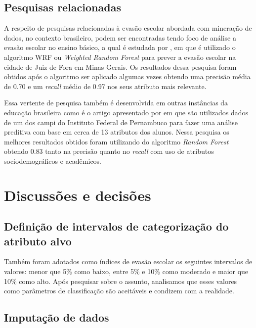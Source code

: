 \subsection{Pesquisas relacionadas}

\par A respeito de pesquisas relacionadas à evasão escolar abordada com mineração de dados, no contexto brasileiro, podem ser encontradas tendo foco de análise a evasão escolar no ensino básico, a qual é estudada por \cite{sales2019evasao}, em que é utilizado o algoritmo WRF ou \textit{Weighted Random Forest} para prever a evasão escolar na cidade de Juiz de Fora em Minas Gerais. Os resultados dessa pesquisa foram obtidos após o algoritmo ser aplicado algumas vezes obtendo uma precisão média de 0.70 e um \textit{recall} médio de 0.97 nos seus atributo mais relevante.

\par Essa vertente de pesquisa também é desenvolvida em outras instâncias da educação brasileira como é o artigo apresentado por \cite{barbosa2023previsao} em que são utilizados dados de um dos campi do Instituto Federal de Pernambuco para fazer uma análise preditiva com base em cerca de 13 atributos dos alunos. Nessa pesquisa os melhores resultados obtidos foram utilizando do algoritmo \textit{Random Forest} obtendo 0.83 tanto na precisão quanto no \textit{recall} com uso de atributos sociodemográficos e acadêmicos.

\section{Discussões e decisões}

\subsection{Definição de intervalos de categorização do atributo alvo}

\par Também foram adotados como índices de evasão escolar os seguintes intervalos de valores: menor que 5\% como baixo, entre 5\% e 10\% como moderado e maior que 10\% como alto. Após pesquisar sobre o assunto, analisamos que esses valores como parâmetros de classificação são aceitáveis e condizem com a realidade.

\subsection{Imputação de dados}

